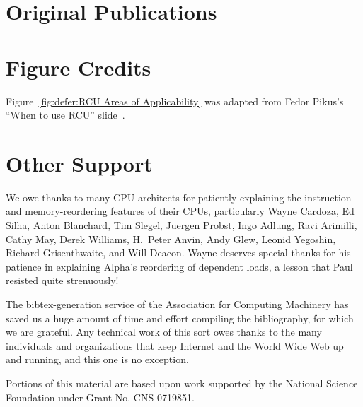 \section{Original Publications}

\ListOriginalPublications

\section{Figure Credits}

\ListContributions

Figure~\ref{fig:defer:RCU Areas of Applicability} was adapted from
Fedor Pikus's ``When to use RCU'' slide~\cite{FedorPikus2017RCUthenWhat}.

\section{Other Support}

We owe thanks to many CPU architects for patiently explaining the
instruction- and memory-reordering features of their CPUs, particularly
Wayne Cardoza, Ed Silha, Anton Blanchard, Tim Slegel, Juergen Probst,
Ingo Adlung, Ravi Arimilli, Cathy May, Derek Williams,
H.~Peter Anvin,
Andy Glew, Leonid Yegoshin,
Richard Grisenthwaite, and Will Deacon.
Wayne deserves special thanks for his patience in explaining Alpha's reordering
of dependent loads, a lesson that Paul resisted quite strenuously!

The bibtex-generation service of the Association for Computing Machinery
has saved us a huge amount of time and effort compiling the bibliography,
for which we are grateful.
Any technical work of this sort owes thanks to the many individuals and
organizations that keep Internet and the World Wide Web up and running,
and this one is no exception.

Portions of this material are based upon work supported by the National
Science Foundation under Grant No. CNS-0719851.

